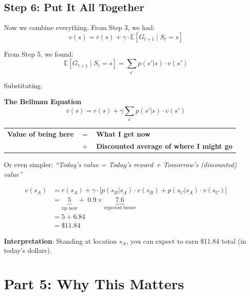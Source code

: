 \documentclass[journal, onecolumn]{IEEEtran}
\begin{document}
\subsection{Step 6: Put It All Together}

Now we combine everything. From Step 3, we had:
\[ v(s) = r(s) + \gamma \cdot \mathbb{E}[G_{t+1} \mid S_t = s] \]

From Step 5, we found:
\[ \mathbb{E}[G_{t+1} \mid S_t = s] = \sum_{s'} p(s'|s) \cdot v(s') \]

Substituting:

\begin{framed}
\centering
\Large
\textbf{The Bellman Equation}
\[ \boxed{v(s) = r(s) + \gamma \sum_{s'} p(s'|s) \cdot v(s')} \]
\end{framed}

\begin{tcolorbox}[memorybox={The Equation in Plain English}]
\begin{center}
\renewcommand{\arraystretch}{1.5}
\begin{tabular}{rcl}
\textbf{Value of being here} & $=$ & \textbf{What I get now} \\
& $+$ & \textbf{Discounted average of where I might go}
\end{tabular}
\end{center}

\vspace{0.5em}
Or even simpler: \textit{``Today's value = Today's reward + Tomorrow's (discounted) value''}
\end{tcolorbox}

\begin{tcolorbox}[examplebox={Final Answer for $s_A$}]
\begin{align*}
v(s_A) &= r(s_A) + \gamma \cdot \bigl[ p(s_B|s_A) \cdot v(s_B) + p(s_C|s_A) \cdot v(s_C) \bigr] \\[0.5em]
&= \underbrace{5}_{\text{tip now}} + \; 0.9 \times \underbrace{7.6}_{\text{expected future}} \\[0.5em]
&= 5 + 6.84 \\[0.5em]
&= \boxed{\$11.84}
\end{align*}

\textbf{Interpretation}: Standing at location $s_A$, you can expect to earn \$11.84 total (in today's dollars).
\end{tcolorbox}

\newpage
\section{Part 5: Why This Matters}
\end{document}

